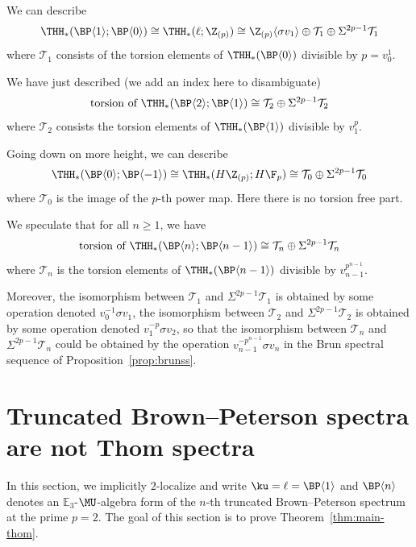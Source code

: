 \begin{remark}
  We can describe
  \[
    \THH_*(\BP \langle 1 \rangle; \BP \langle 0 \rangle) \cong \THH_*(\ell; \Z_{(p)}) \cong \Z_{(p)}\langle \sigma v_1 \rangle \oplus \mathcal{T}_1 \oplus \Sigma^{2p - 1} \mathcal{T}_1
  \]
  where $\mathcal{T}_1$ consists of the torsion elements of $\THH_*(\BP \langle 0 \rangle)$ divisible by $p = v_0^1$.

  We have just described (we add an index here to disambiguate)
  \[
    \text{torsion of } \THH_*(\BP \langle 2 \rangle; \BP \langle 1 \rangle)\cong  \mathcal{T}_2 \oplus \Sigma^{2p - 1} \mathcal{T}_2
  \]
  where $\mathcal{T}_2$ consists the torsion elements of $\THH_*(\BP \langle 1 \rangle)$ divisible by $v_1^p$.

  Going down on more height, we can describe
  \[
    \THH_*(\BP \langle 0 \rangle; \BP \langle -1 \rangle) \cong \THH_*(H \Z_{(p)}; H\F_p) \cong \mathcal{T}_0 \oplus \Sigma^{2p - 1} \mathcal{T}_0
  \]
  where $\mathcal{T}_0$ is the image of the $p$-th power map. Here there is no torsion free part. 
  
  We speculate that for all $n \geq 1$, we have
  \[
    \text{torsion of } \THH_*(\BP \langle n \rangle; \BP \langle n-1 \rangle) \cong  \mathcal{T}_n \oplus \Sigma^{2p - 1} \mathcal{T}_n
  \]
  where $\mathcal{T}_n$ is the torsion elements of $\THH_*(\BP \langle n-1 \rangle)$ divisible by $v_{n-1}^{p^{n-1}}$.


  
  Moreover, the isomorphism between $\mathcal{T}_1$ and $\Sigma^{2p-1} \mathcal{T}_1$ is obtained by some operation  denoted $v_0^{-1} \sigma v_1$, the isomorphism between $\mathcal{T}_2$ and $\Sigma^{2p-1} \mathcal{T}_2$ is obtained by some operation denoted $v_1^{-p} \sigma v_2$, so that the isomorphism between $\mathcal{T}_n$ and $\Sigma^{2p-1} \mathcal{T}_n$ could be obtained by the operation $v_{n-1}^{-p^{n-1}} \sigma v_n$ in the Brun spectral sequence of Proposition~\ref{prop:brunss}.
\end{remark}


\section{Truncated Brown--Peterson spectra are not Thom spectra}\label{notThom}

In this section, we implicitly $2$-localize and write $\ku=\ell=\BP\langle 1\rangle$ and $\BP\langle n\rangle$ denotes an $\mathbb{E}_3$-$\MU$-algebra form of the $n$-th truncated Brown--Peterson spectrum at the prime $p=2$. 
The goal of this section is to prove Theorem~\ref{thm:main-thom}. 


